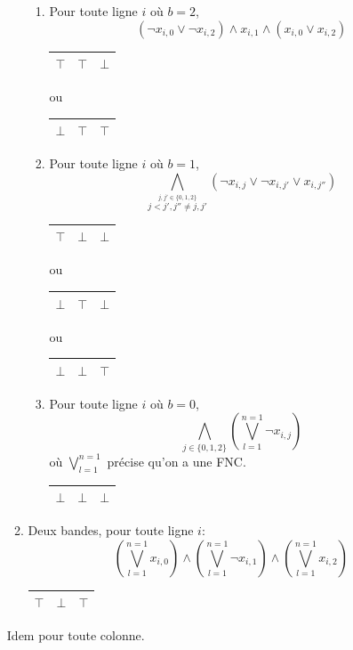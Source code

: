 \documentclass[a4paper,12pt]{report}
\begin{document}
\begin{enumerate}
\begin{enumerate}
\begin{enumerate}
			\item Pour toute ligne $i$ où $b=2$, 
			$$(\lnot x_{i,0} \vee \lnot x_{i,2}) \wedge x_{i,1}\wedge (x_{i,0} \vee x_{i,2}) $$
			\begin{center}						
			\begin{tabular}{|c|c|c|}
			\hline 
			$\top$ & $\top$  & $\bot$  \\ 
			\hline  
			\end{tabular}
			ou
			\begin{tabular}{|c|c|c|}
			\hline 
			$\bot$ & $\top$  & $\top$  \\ 
			\hline  
			\end{tabular}
			\end{center}
			
			\item Pour toute ligne $i$ où $b=1$, 
			$$\bigwedge_{\stackrel{j,j' \in\{0,1,2\}}{j<j', j''\neq j,j'}} (\lnot x_{i,j}\vee \lnot x_{i,j'} \vee x_{i,j''} ) $$
			\begin{center}						
			\begin{tabular}{|c|c|c|}
			\hline 
			$\top$ & $\bot$  & $\bot$  \\ 
			\hline  
			\end{tabular}
			ou
			\begin{tabular}{|c|c|c|}
			\hline 
			$\bot$ & $\top$  & $\bot$  \\ 
			\hline  
			\end{tabular}
			ou
			\begin{tabular}{|c|c|c|}
			\hline 
			$\bot$ & $\bot$  & $\top$  \\ 
			\hline  
			\end{tabular}
			\end{center}
			
			\item Pour toute ligne $i$ où $b=0$,
			$$\bigwedge_{j\in\{0,1,2\}}\left( \bigvee_{l=1}^{n=1} \lnot x_{i,j} \right)$$
			où $\bigvee_{l=1}^{n=1}$ précise qu'on a une FNC.
			\begin{center}						
			\begin{tabular}{|c|c|c|}
			\hline 
			$\bot$ & $\bot$  & $\bot$  \\ 
			\hline  
			\end{tabular}
			\end{center}
			
		\end{enumerate}

		\item Deux bandes, pour toute ligne $i$:
		$$\left( \bigvee_{l=1}^{n=1} x_{i,0} \right) \wedge \left(\bigvee_{l=1}^{n=1} \lnot x_{i,1}\right) \wedge \left(\bigvee_{l=1}^{n=1} x_{i,2}\right)$$
			\begin{center}						
			\begin{tabular}{|c|c|c|}
			\hline 
			$\top$ & $\bot$  & $\top$  \\ 
			\hline  
			\end{tabular}
			\end{center}
			
	\end{enumerate}
	Idem pour toute colonne. 
\end{enumerate}
\end{document}
